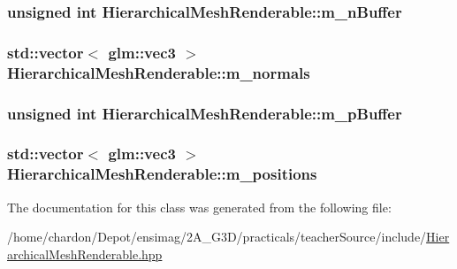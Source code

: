 \hypertarget{classHierarchicalMeshRenderable_ae781c5aa305cc72608e3bd1b56129410}{
\subsubsection[{m\+\_\+n\+Buffer}]{\setlength{\rightskip}{0pt plus 5cm}unsigned int Hierarchical\+Mesh\+Renderable\+::m\+\_\+n\+Buffer\hspace{0.3cm}{\ttfamily [private]}}}\label{classHierarchicalMeshRenderable_ae781c5aa305cc72608e3bd1b56129410}
\hypertarget{classHierarchicalMeshRenderable_a0434afe3af71c5afcd7a3bc8318a0e98}{
\subsubsection[{m\+\_\+normals}]{\setlength{\rightskip}{0pt plus 5cm}std\+::vector$<$ glm\+::vec3 $>$ Hierarchical\+Mesh\+Renderable\+::m\+\_\+normals\hspace{0.3cm}{\ttfamily [private]}}}\label{classHierarchicalMeshRenderable_a0434afe3af71c5afcd7a3bc8318a0e98}
\hypertarget{classHierarchicalMeshRenderable_abe9a8d6e06601db7f9e7ab8a5e306b78}{
\subsubsection[{m\+\_\+p\+Buffer}]{\setlength{\rightskip}{0pt plus 5cm}unsigned int Hierarchical\+Mesh\+Renderable\+::m\+\_\+p\+Buffer\hspace{0.3cm}{\ttfamily [private]}}}\label{classHierarchicalMeshRenderable_abe9a8d6e06601db7f9e7ab8a5e306b78}
\hypertarget{classHierarchicalMeshRenderable_a71289ce6648a162703a37814cb518459}{
\subsubsection[{m\+\_\+positions}]{\setlength{\rightskip}{0pt plus 5cm}std\+::vector$<$ glm\+::vec3 $>$ Hierarchical\+Mesh\+Renderable\+::m\+\_\+positions\hspace{0.3cm}{\ttfamily [private]}}}\label{classHierarchicalMeshRenderable_a71289ce6648a162703a37814cb518459}


The documentation for this class was generated from the following file\+:\begin{DoxyCompactItemize}
\item 
/home/chardon/\+Depot/ensimag/2\+A\+\_\+\+G3\+D/practicals/teacher\+Source/include/\hyperlink{HierarchicalMeshRenderable_8hpp}{Hierarchical\+Mesh\+Renderable.\+hpp}\end{DoxyCompactItemize}
